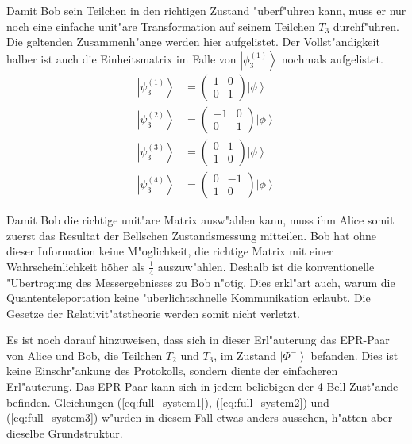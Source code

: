 \begin{refsection}
Damit Bob sein Teilchen in den richtigen Zustand "uberf"uhren kann, muss er nur noch eine einfache unit"are Transformation auf seinem Teilchen $T_{3}$ durchf"uhren. Die geltenden Zusammenh"ange werden hier aufgelistet. Der Vollst"andigkeit halber ist auch die Einheitsmatrix im Falle von $\left|\phi_{3}^{(1)}\right\rangle$ nochmals aufgelistet.
\begin{align}
	\left| \psi_{3}^{(1)} \right \rangle & = \begin{pmatrix} 1 & 0 \\ 0 & 1 \end{pmatrix} \left| \phi \right \rangle \\
	\left| \psi_{3}^{(2)} \right \rangle & = \begin{pmatrix} -1 & 0 \\ 0 & 1 \end{pmatrix} \left| \phi \right \rangle \\
	\left| \psi_{3}^{(3)} \right \rangle & = \begin{pmatrix} 0 & 1 \\ 1 & 0 \end{pmatrix} \left| \phi \right \rangle \\
	\left| \psi_{3}^{(4)} \right \rangle & = \begin{pmatrix} 0 & -1 \\ 1 & 0 \end{pmatrix} \left| \phi \right \rangle
\end{align}

Damit Bob die richtige unit"are Matrix ausw"ahlen kann, muss ihm Alice somit zuerst das Resultat der Bellschen Zustandsmessung mitteilen. Bob hat ohne dieser Information keine M"oglichkeit, die richtige Matrix mit einer Wahrscheinlichkeit höher als $\frac{1}{4}$ auszuw"ahlen. Deshalb ist die konventionelle "Ubertragung des Messergebnisses zu Bob n"otig. Dies erkl"art auch, warum die Quantenteleportation keine "uberlichtschnelle Kommunikation erlaubt. Die Gesetze der Relativit"atstheorie werden somit nicht verletzt.

Es ist noch darauf hinzuweisen, dass sich in dieser Erl"auterung das EPR-Paar von Alice und Bob, die Teilchen $T_{2}$ und $T_{3}$, im Zustand $\left| \Phi^{-} \right\rangle$ befanden. Dies ist keine Einschr"ankung des Protokolls, sondern diente der einfacheren Erl"auterung. Das EPR-Paar kann sich in jedem beliebigen der 4 Bell Zust"ande befinden. Gleichungen (\ref{eq:full_system1}), (\ref{eq:full_system2}) und (\ref{eq:full_system3}) w"urden in diesem Fall etwas anders aussehen, h"atten aber dieselbe Grundstruktur.


\end{refsection}
